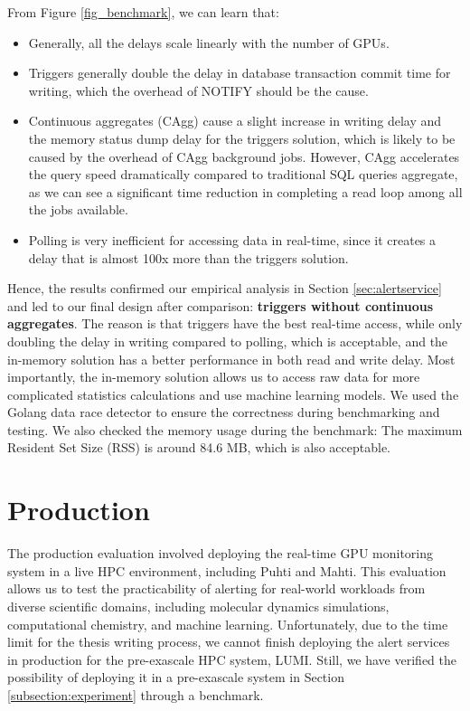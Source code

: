 From Figure \ref{fig_benchmark}, we can learn that:

\begin{itemize}
    \item Generally, all the delays scale linearly with the number of GPUs.
    \item Triggers generally double the delay in database transaction commit time for writing, which the overhead of NOTIFY should be the cause.
    \item Continuous aggregates (CAgg) cause a slight increase in writing delay and the memory status dump delay for the triggers solution, which is likely to be caused by the overhead of CAgg background jobs. However, CAgg accelerates the query speed dramatically compared to traditional SQL queries aggregate, as we can see a significant time reduction in completing a read loop among all the jobs available.
    \item Polling is very inefficient for accessing data in real-time, since it creates a delay that is almost 100x more than the triggers solution.
\end{itemize}

Hence, the results confirmed our empirical analysis in Section \ref{sec:alertservice} and led to our final design after comparison: \textbf{triggers without continuous aggregates}. The reason is that triggers have the best real-time access, while only doubling the delay in writing compared to polling, which is acceptable, and the in-memory solution has a better performance in both read and write delay. Most importantly, the in-memory solution allows us to access raw data for more complicated statistics calculations and use machine learning models. We used the Golang data race detector to ensure the correctness during benchmarking and testing. We also checked the memory usage during the benchmark: The maximum Resident Set Size (RSS) is around 84.6 MB, which is also acceptable.


\section{Production}

The production evaluation involved deploying the real-time GPU monitoring system in a live HPC environment, including Puhti and Mahti. This evaluation allows us to test the practicability of alerting for real-world workloads from diverse scientific domains, including molecular dynamics simulations, computational chemistry, and machine learning. Unfortunately, due to the time limit for the thesis writing process, we cannot finish deploying the alert services in production for the pre-exascale HPC system, LUMI. Still, we have verified the possibility of deploying it in a pre-exascale system in Section \ref{subsection:experiment} through a benchmark.

